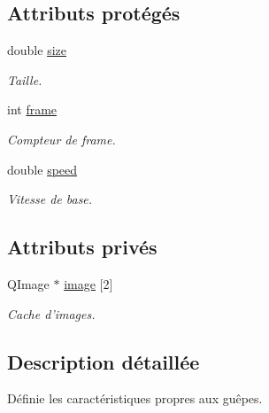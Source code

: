 \subsection*{Attributs protégés}
\begin{DoxyCompactItemize}
\item 
double \hyperlink{classBug_a27a0f0b84d15525e409955509e6e3c42}{size}
\begin{DoxyCompactList}\small\item\em Taille. \end{DoxyCompactList}\item 
int \hyperlink{classBug_ad7e3597cf049f1051be94fcaf2fd3598}{frame}
\begin{DoxyCompactList}\small\item\em Compteur de frame. \end{DoxyCompactList}\item 
double \hyperlink{classBug_a13b95fbf23748ea853b01bfd0b0e7fc8}{speed}
\begin{DoxyCompactList}\small\item\em Vitesse de base. \end{DoxyCompactList}\end{DoxyCompactItemize}
\subsection*{Attributs privés}
\begin{DoxyCompactItemize}
\item 
QImage $\ast$ \hyperlink{classWasp_abdd2e9eb377bb31907494f72067691f8}{image} \mbox{[}2\mbox{]}
\begin{DoxyCompactList}\small\item\em Cache d'images. \end{DoxyCompactList}\end{DoxyCompactItemize}


\subsection{Description détaillée}
Définie les caractéristiques propres aux guêpes. 

